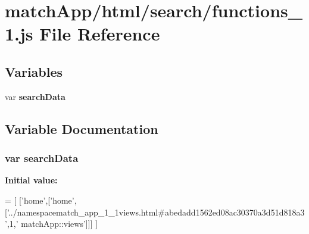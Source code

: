 \section{match\+App/html/search/functions\+\_\+1.js File Reference}
\label{functions__1_8js}
\subsection*{Variables}
\begin{DoxyCompactItemize}
\item 
var {\bf search\+Data}
\end{DoxyCompactItemize}


\subsection{Variable Documentation}
\subsubsection[{search\+Data}]{\setlength{\rightskip}{0pt plus 5cm}var search\+Data}\label{functions__1_8js_ad01a7523f103d6242ef9b0451861231e}
{\bfseries Initial value\+:}
\begin{DoxyCode}
=
[
  [\textcolor{stringliteral}{'home'},[\textcolor{stringliteral}{'home'},[\textcolor{stringliteral}{'../namespacematch\_app\_1\_1views.html#abedadd1562ed08ac30370a3d51d818a3'},1,\textcolor{stringliteral}{'
      matchApp::views'}]]]
]
\end{DoxyCode}
